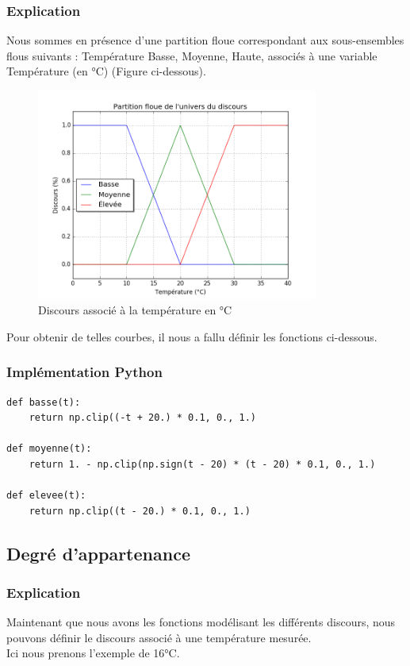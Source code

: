 \documentclass[a4paper]{article}
\begin{document}
\subsubsection{Explication}
Nous sommes en présence d'une partition floue correspondant aux sous-ensembles flous suivants : Température Basse, Moyenne, Haute, associés à une variable Température (en °C) (Figure ci-dessous).

\begin{figure}[h]
\begin{center}
	\includegraphics[width=350px]{plot_3.png}
\end{center}
\caption{Discours associé à la température en °C}
\end{figure}

Pour obtenir de telles courbes, il nous a fallu définir les fonctions ci-dessous.

\subsubsection{Implémentation Python}
\begin{lstlisting}
def basse(t):
    return np.clip((-t + 20.) * 0.1, 0., 1.)

def moyenne(t):
    return 1. - np.clip(np.sign(t - 20) * (t - 20) * 0.1, 0., 1.)

def elevee(t):
    return np.clip((t - 20.) * 0.1, 0., 1.)
\end{lstlisting}

\clearpage
\subsection{Degré d'appartenance}

\subsubsection{Explication}
Maintenant que nous avons les fonctions modélisant les différents discours, nous pouvons définir le discours associé à une température mesurée.\\
Ici nous prenons l'exemple de 16°C.
\end{document}
